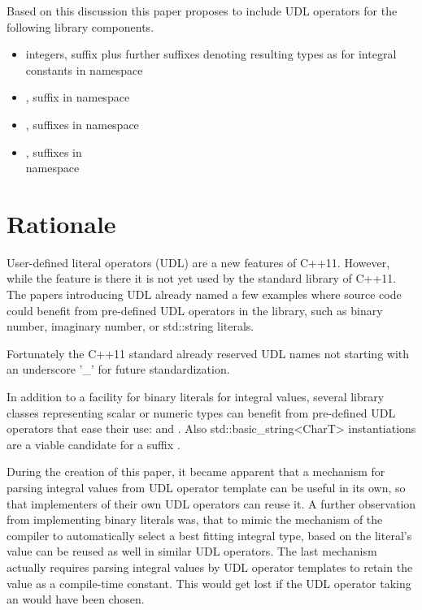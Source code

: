 \documentclass[ebook,11pt,article]{memoir}
\begin{document}
Based on this discussion this paper proposes to include UDL operators for the following library components.
\begin{itemize}
\item {} integers, suffix  plus further suffixes denoting resulting types as for integral constants in namespace 
\item {}, suffix  in namespace 
\item {}, suffixes  in namespace 
\item {}, suffixes  in \\namespace {}
\end{itemize}

\section{Rationale}
User-defined literal operators (UDL) are a new features of C++11. However, while the feature is there it is not yet used by the standard library of C++11. The papers introducing UDL already named a few examples where source code could benefit from pre-defined UDL operators in the library, such as binary number, imaginary number, or std::string literals.

Fortunately the C++11 standard already reserved UDL names not starting with an underscore '_' for future standardization. 

In addition to a facility for binary literals for integral values, several library classes representing scalar or numeric types can benefit from pre-defined UDL operators that ease their use:  and . Also std::basic_string<CharT> instantiations are a viable candidate for a suffix .

During the creation of this paper, it became apparent that a mechanism for parsing integral values from UDL operator template can be useful in its own, so that implementers of their own UDL operators can reuse it. A further observation from implementing binary literals was, that to mimic the mechanism of the compiler to automatically select a best fitting integral type, based on the literal's value can be reused as well in similar UDL operators. The last mechanism actually requires parsing integral values by UDL operator templates to retain the value as a compile-time constant. This would get lost if the UDL operator taking an  would have been chosen.
\end{document}
